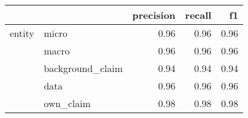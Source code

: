 \begin{tabular}{llrrr}
\toprule
       &           &  precision &  recall &   f1 \\
\midrule
entity & micro &       0.96 &    0.96 & 0.96 \\
       & macro &       0.96 &    0.96 & 0.96 \\
       & background\_claim &       0.94 &    0.94 & 0.94 \\
       & data &       0.96 &    0.96 & 0.96 \\
       & own\_claim &       0.98 &    0.98 & 0.98 \\
\bottomrule
\end{tabular}
